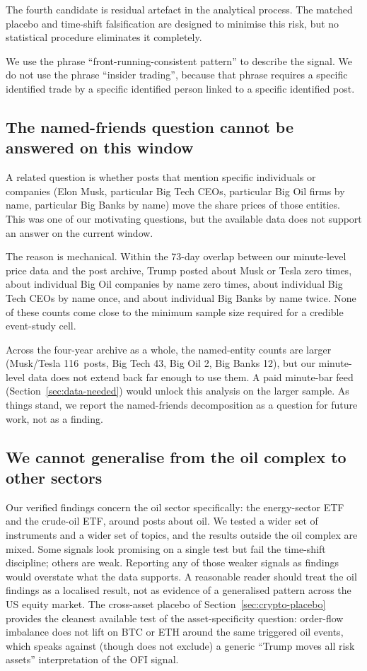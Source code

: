 \documentclass[11pt,a4paper]{article}
\begin{document}
The fourth candidate is residual artefact in the analytical process. The matched placebo and time-shift falsification are designed to minimise this risk, but no statistical procedure eliminates it completely.

We use the phrase ``front-running-consistent pattern'' to describe the signal. We do not use the phrase ``insider trading'', because that phrase requires a specific identified trade by a specific identified person linked to a specific identified post.

\subsection{The named-friends question cannot be answered on this window}

A related question is whether posts that mention specific individuals or companies (Elon Musk, particular Big Tech CEOs, particular Big Oil firms by name, particular Big Banks by name) move the share prices of those entities. This was one of our motivating questions, but the available data does not support an answer on the current window.

The reason is mechanical. Within the 73-day overlap between our minute-level price data and the post archive, Trump posted about Musk or Tesla zero times, about individual Big Oil companies by name zero times, about individual Big Tech CEOs by name once, and about individual Big Banks by name twice. None of these counts come close to the minimum sample size required for a credible event-study cell.

Across the four-year archive as a whole, the named-entity counts are larger (Musk/Tesla 116~posts, Big Tech 43, Big Oil 2, Big Banks 12), but our minute-level data does not extend back far enough to use them. A paid minute-bar feed (Section~\ref{sec:data-needed}) would unlock this analysis on the larger sample. As things stand, we report the named-friends decomposition as a question for future work, not as a finding.

\subsection{We cannot generalise from the oil complex to other sectors}

Our verified findings concern the oil sector specifically: the energy-sector ETF and the crude-oil ETF, around posts about oil. We tested a wider set of instruments and a wider set of topics, and the results outside the oil complex are mixed. Some signals look promising on a single test but fail the time-shift discipline; others are weak. Reporting any of those weaker signals as findings would overstate what the data supports. A reasonable reader should treat the oil findings as a localised result, not as evidence of a generalised pattern across the US equity market. The cross-asset placebo of Section~\ref{sec:crypto-placebo} provides the cleanest available test of the asset-specificity question: order-flow imbalance does not lift on BTC or ETH around the same triggered oil events, which speaks against (though does not exclude) a generic ``Trump moves all risk assets'' interpretation of the OFI signal.
\end{document}
